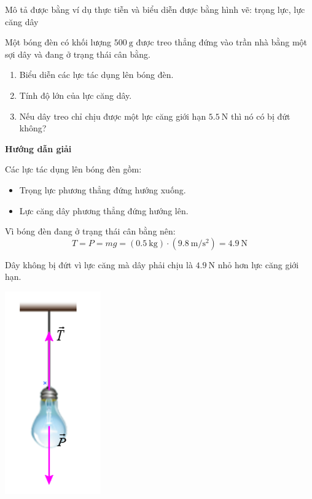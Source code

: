 \begin{dang}{Mô tả được bằng ví dụ thực tiễn và biểu diễn được bằng hình vẽ: trọng lực, lực căng dây}
	{Một bóng đèn có khối lượng $\SI{500}{\gram}$ được treo thẳng đứng vào trần nhà bằng một sợi dây và đang ở trạng thái cân bằng.
		\begin{enumerate}[label=\alph*)]
			\item Biểu diễn các lực tác dụng lên bóng đèn.
			\item Tính độ lớn của lực căng dây.
			\item Nếu dây treo chỉ chịu được một lực căng giới hạn $\SI{5.5}{\newton}$ thì nó có bị đứt không?
		\end{enumerate}
}
{\begin{center}
		\textbf{Hướng dẫn giải}
	\end{center}
\begin{enumerate}[label=\alph*)]
\begin{minipage}[l]{0.6\textwidth}
\item Các lực tác dụng lên bóng đèn gồm:
	\begin{itemize}
		\item Trọng lực phương thẳng đứng hướng xuống.
		\item Lực căng dây phương thẳng đứng hướng lên.
	\end{itemize}
\item Vì bóng đèn đang ở trạng thái cân bằng nên:
$$T=P=mg=\left(\SI{0.5}{\kilogram}\right)\cdot\left(\SI{9.8}{\meter/\second^2}\right)=\SI{4.9}{\newton}$$
\item Dây không bị đứt vì lực căng mà dây phải chịu là $\SI{4.9}{\newton}$ nhỏ hơn lực căng giới hạn.
\end{minipage}
\begin{minipage}{0.4\textwidth}
	\begin{center}
		\includegraphics[width=0.3\linewidth]{../figs/VN10-2023-PH-TP018-2}
	\end{center}
\end{minipage}
\end{enumerate}
}
\end{dang}
